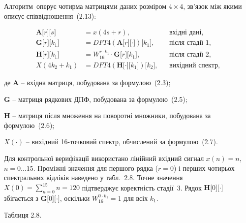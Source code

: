 \documentclass[
]{article}
\begin{document}
Алгоритм~оперує чотирма матрицями даних розміром \(4 \times 4\), зв'язок
між якими описує співвідношення~(2.13):

\begin{equation}
\tag{2.13}\label{eq:matrix-flow}
\begin{aligned}
\mathbf{A}\lbrack r\rbrack\lbrack s\rbrack & = x(4s + r), & & \text{вхідні дані,} \\
\mathbf{G}\lbrack r\rbrack\lbrack k_{1}\rbrack & = DFT4(\mathbf{A}\lbrack r\rbrack\lbrack \cdot \rbrack)\lbrack k_{1}\rbrack, & & \text{після стадії 1,} \\
\mathbf{H}\lbrack r\rbrack\lbrack k_{1}\rbrack & = W_{16}^{r \cdot k_{1}} \cdot \mathbf{G}\lbrack r\rbrack\lbrack k_{1}\rbrack, & & \text{після стадії 2,} \\
X(4k_{2} + k_{1}) & = DFT4(\mathbf{H}\lbrack \cdot \rbrack\lbrack k_{1}\rbrack)\lbrack k_{2}\rbrack, & & \text{вихідний спектр,}
\end{aligned}
\end{equation}

де \(\mathbf{A}\) -- вхідна матриця, побудована за формулою~(2.3);

\(\mathbf{G}\) -- матриця рядкових ДПФ, побудована за формулою~(2.5);

\(\mathbf{H}\) -- матриця після множення на поворотні множники, побудована за формулою~(2.6);

\(X(\cdot)\) -- вихідний 16-точковий спектр, обчислений за формулою~(2.7).

Для контрольної верифікації використано лінійний вхідний сигнал
\(x(n) = n\), \(n = 0\ldots 15\). Проміжні значення для першого рядка
(\(r = 0\)) і перших чотирьох спектральних відліків наведено у
табл.~2.8. Точне значення \(X(0) = \sum_{n = 0}^{15}n = 120\)
підтверджує коректність стадії~3. Рядок
\(\mathbf{H}\lbrack 0\rbrack\lbrack \cdot \rbrack\) збігається з
\(\mathbf{G}\lbrack 0\rbrack\lbrack \cdot \rbrack\), оскільки
\(W_{16}^{0 \cdot k_{1}} = 1\) для всіх \(k_{1}\).

Таблиця 2.8.
\end{document}
